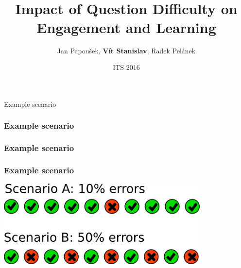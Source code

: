\documentclass[bigger]{beamer}
\title{Impact of Question Difficulty on Engagement and Learning}
\author{Jan Papou\v{s}ek, \textbf{V\'it Stanislav}, Radek Pel\'anek \\
}
\date{ITS 2016}
\begin{document}
\frame{\titlepage}


\begin{frame}
	\begin{center}
    {\Huge Example scenario} 
	\end{center}
\end{frame}

\begin{frame}
  \frametitle{Example scenario}
	\noindent{}
\end{frame}

\begin{frame}
  \frametitle{Example scenario}
	\noindent{}
\end{frame}

\begin{frame}
  \frametitle{Example scenario}
    \begin{center}
      \includegraphics[width=0.8\textwidth]{img/error_rate_scenarios}
    \end{center}
\end{frame}
\end{document}

